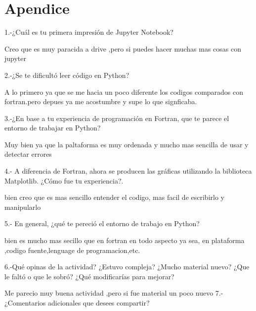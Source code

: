\documentclass{article}
\begin{document}
\section{Apendice }


1.-¿Cuál es tu primera impresión de Jupyter Notebook?


Creo que es muy paracida a drive ,pero si puedes hacer muchas mas cosas con jupyter


2.-¿Se te dificultó leer código en Python?


A lo primero ya que se me hacia un poco diferente los codigos comparados con fortran.pero depues  ya me acostumbre y supe lo que signficaba.


3.-¿En base a tu experiencia de programación en Fortran, que te parece el entorno de trabajar en Python?

Muy bien ya que la paltaforma es muy ordenada y mucho mas sencilla de usar y detectar errores


4.- A diferencia de Fortran, ahora se producen las gráficas utilizando la biblioteca Matplotlib. ¿Cómo fue tu experiencia?.


bien creo que es mas sencillo entender el codigo, mas facil de escribirlo y manipularlo

5.- En general, ¿qué te pereció el entorno de trabajo en Python?

bien es mucho mas secillo que en fortran en todo aspecto ya sea, en plataforma ,codigo fuente,lenguage de programacion,etc.


6.-Qué opinas de la actividad? ¿Estuvo compleja? ¿Mucho material nuevo? ¿Que le faltó o que le sobró? ¿Qué modificarías para mejorar?

Me parecio muy buena actividad ,pero si fue material un poco nuevo
7.-¿Comentarios adicionales que desees compartir?
\end{document}
